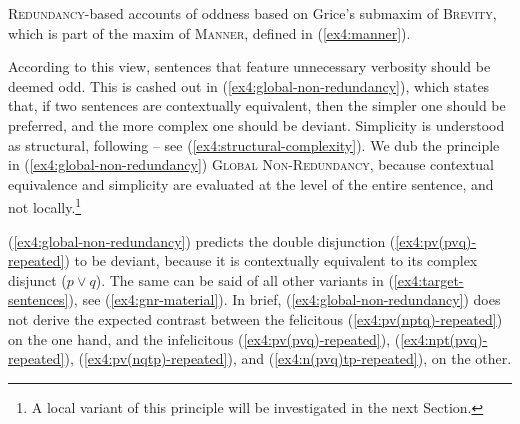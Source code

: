 \textsc{Redundancy}-based accounts of oddness based on Grice's submaxim of \textsc{Brevity}, which is part of the maxim of \textsc{Manner}, defined in (\ref{ex4:manner}).

\begin{exe}
	\label{ex4:manner}
\end{exe}

According to this view, sentences that feature unnecessary verbosity should be deemed odd. This is cashed out in (\ref{ex4:global-non-redundancy}), which states that, if two sentences are contextually equivalent, then the simpler one should be preferred, and the more complex one should be deviant. Simplicity is understood as structural, following \citet{Katzir2007} -- see (\ref{ex4:structural-complexity}). We dub the principle in (\ref{ex4:global-non-redundancy}) \textsc{Global Non-Redundancy}, because contextual equivalence and simplicity are evaluated at the level of the entire sentence, and not locally.\footnote{A local variant of this principle will be investigated in the next Section.}

\begin{exe}
	\label{ex4:global-non-redundancy}
	\label{ex4:structural-complexity}
\end{exe}

(\ref{ex4:global-non-redundancy}) predicts the double disjunction (\ref{ex4:pv(pvq)-repeated}) to be deviant, because it is contextually equivalent to its complex disjunct ($p\vee q$). The same can be said of all other variants in (\ref{ex4:target-sentences}), see (\ref{ex4:gnr-material}). In brief, (\ref{ex4:global-non-redundancy}) does not derive the expected contrast between the felicitous (\ref{ex4:pv(nptq)-repeated}) on the one hand, and the infelicitous (\ref{ex4:pv(pvq)-repeated}), (\ref{ex4:npt(pvq)-repeated}), (\ref{ex4:pv(nqtp)-repeated}), and (\ref{ex4:n(pvq)tp-repeated}), on the other.

